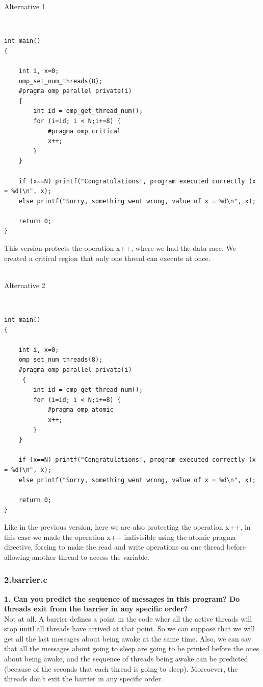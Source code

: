 \documentclass[12]{article}
\begin{document}
\begin{Large}
Alternative 1
\end{Large}
\\
\begin{lstlisting}[frame=single]
int main()
{

    int i, x=0;
    omp_set_num_threads(8);
    #pragma omp parallel private(i)
    {
    	int id = omp_get_thread_num();
    	for (i=id; i < N;i+=8) {
        	#pragma omp critical
        	x++;
    	}
	}

    if (x==N) printf("Congratulations!, program executed correctly (x = %d)\n", x);
    else printf("Sorry, something went wrong, value of x = %d\n", x);

    return 0;
}  
\end{lstlisting}  
This version protects the operation x++, where we had the data race. We created a critical region that only one thread can execute at once.
\\
\\
\medskip
\begin{Large}
Alternative 2
\end{Large}
\\
\begin{lstlisting}[frame=single]
int main()
{

    int i, x=0;
    omp_set_num_threads(8);
    #pragma omp parallel private(i)
     {
    	int id = omp_get_thread_num();
   		for (i=id; i < N;i+=8) {
        	#pragma omp atomic
        	x++;
    	}
	}

    if (x==N) printf("Congratulations!, program executed correctly (x = %d)\n", x);
    else printf("Sorry, something went wrong, value of x = %d\n", x);

    return 0;
}
\end{lstlisting}
Like in the previous version, here we are also protecting the operation x++, in this case we made the operation x++ indivisible using the atomic pragma directive, forcing to make the read and write operations on one thread before allowing another thread to access the variable. 

\subsubsection{2.barrier.c}
\textbf{1. Can you predict the sequence of messages in this program? Do threads exit from the barrier
in any specific order?} 
\\
Not at all.
A barrier defines a point in the code wher all the active threads will stop unitl all threads have arrived at that point. So we can suppose that we will get all the last messages about being awake at the same time. Also, we can say that all the messages about going to sleep are going to be printed before the ones about being awake, and the sequence of threads being awake can be predicted (because of the seconds that each thread is going to sleep). Moreoever, the threads don't exit the barrier in any specific order. 
\end{document}
